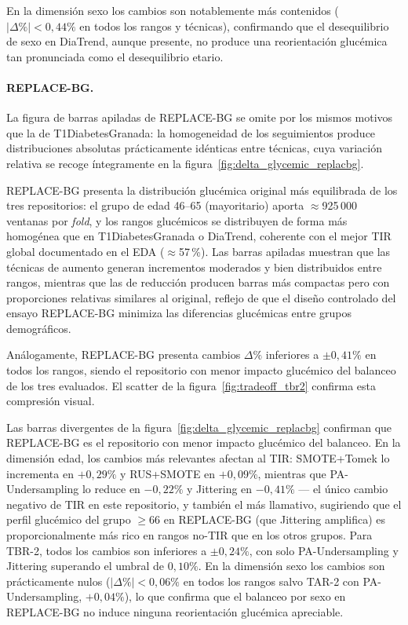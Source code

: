 En la dimensión sexo los cambios son notablemente más contenidos
($|\Delta\%| < 0{,}44\%$ en todos los rangos y técnicas), confirmando que
el desequilibrio de sexo en DiaTrend, aunque presente, no produce una
reorientación glucémica tan pronunciada como el desequilibrio etario.

\paragraph{REPLACE-BG.}

La figura de barras apiladas de REPLACE-BG se omite por los mismos motivos que la de T1DiabetesGranada: la homogeneidad de los seguimientos produce distribuciones absolutas prácticamente idénticas entre técnicas, cuya variación relativa se recoge íntegramente en la figura~\ref{fig:delta_glycemic_replacbg}.

REPLACE-BG presenta la distribución glucémica original más equilibrada de
los tres repositorios: el grupo de edad 46--65 (mayoritario) aporta
$\approx$925\,000 ventanas por \textit{fold}, y los rangos glucémicos se
distribuyen de forma más homogénea que en T1DiabetesGranada o DiaTrend,
coherente con el mejor TIR global documentado en el EDA ($\approx$57\,\%).
Las barras apiladas muestran que las técnicas de aumento generan incrementos
moderados y bien distribuidos entre rangos, mientras que las de reducción
producen barras más compactas pero con proporciones relativas similares al
original, reflejo de que el diseño controlado del ensayo REPLACE-BG minimiza
las diferencias glucémicas entre grupos demográficos.

Análogamente, REPLACE-BG presenta cambios 
$\Delta\%$ inferiores a 
$\pm 0,41\%$ en todos los rangos, siendo el repositorio con menor impacto glucémico del balanceo de los tres evaluados. El scatter de la figura~\ref{fig:tradeoff_tbr2} confirma esta compresión visual.

Las barras divergentes de la figura~\ref{fig:delta_glycemic_replacbg}
confirman que REPLACE-BG es el repositorio con menor impacto glucémico
del balanceo. En la dimensión edad, los cambios más relevantes afectan al
TIR: SMOTE+Tomek lo incrementa en $+0{,}29\%$ y RUS+SMOTE en $+0{,}09\%$,
mientras que PA-Undersampling lo reduce en $-0{,}22\%$ y Jittering en
$-0{,}41\%$ --- el único cambio negativo de TIR en este repositorio, y
también el más llamativo, sugiriendo que el perfil glucémico del grupo
$\geq$66 en REPLACE-BG (que Jittering amplifica) es proporcionalmente
más rico en rangos no-TIR que en los otros grupos. Para TBR-2, todos los
cambios son inferiores a $\pm 0{,}24\%$, con solo PA-Undersampling y
Jittering superando el umbral de $0{,}10\%$. En la dimensión sexo los
cambios son prácticamente nulos ($|\Delta\%| < 0{,}06\%$ en todos los
rangos salvo TAR-2 con PA-Undersampling, $+0{,}04\%$), lo que confirma
que el balanceo por sexo en REPLACE-BG no induce ninguna reorientación
glucémica apreciable.

